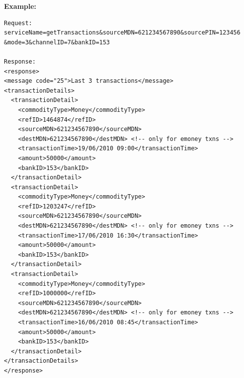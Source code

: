 \documentclass[11pt,titlepage]{article}
\begin{document}
\textbf{Example:}
\begin{verbatim}
Request:
serviceName=getTransactions&sourceMDN=621234567890&sourcePIN=123456
&mode=3&channelID=7&bankID=153

Response:
<response>
<message code="25">Last 3 transactions</message>
<transactionDetails>
  <transactionDetail>
    <commodityType>Money</commodityType>
    <refID>1464874</refID>
    <sourceMDN>621234567890</sourceMDN>
    <destMDN>621234567890</destMDN> <!-- only for emoney txns -->
    <transactionTime>19/06/2010 09:00</transactionTime>
    <amount>50000</amount>
    <bankID>153</bankID>
  </transactionDetail>
  <transactionDetail>
    <commodityType>Money</commodityType>
    <refID>1203247</refID>
    <sourceMDN>621234567890</sourceMDN>
    <destMDN>621234567890</destMDN> <!-- only for emoney txns -->
    <transactionTime>17/06/2010 16:30</transactionTime>
    <amount>50000</amount>
    <bankID>153</bankID>
  </transactionDetail>
  <transactionDetail>
    <commodityType>Money</commodityType>
    <refID>1000000</refID>
    <sourceMDN>621234567890</sourceMDN>
    <destMDN>621234567890</destMDN> <!-- only for emoney txns -->
    <transactionTime>16/06/2010 08:45</transactionTime>
    <amount>50000</amount>
    <bankID>153</bankID>
  </transactionDetail>
</transactionDetails>
</response>
\end{verbatim}
\end{document}
